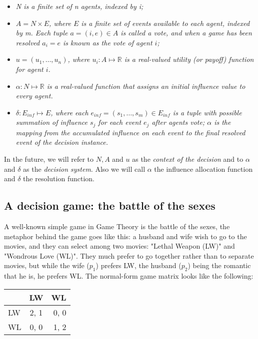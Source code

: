 \begin{itemize}
  \item \textit{N is a finite set of n agents, indexed by i;}
  \item \textit{$A = N \times E $, where $E$ is a finite set of events available to each agent, indexed by m. Each tuple $ a = (i, e) \in A $ is called a vote, and when a game has been resolved $a_{i} = e$ is known as the vote of agent $i$;}
  \item \textit{$u = (u_{1}, \dots , u_{n}) $, where $ u_{i} : A \mapsto \mathbb{R} $ is a real-valued utility (or payoff) function for agent $i$.}
  \item \textit{$ \alpha : N \mapsto \mathbb{R} $ is a real-valued function that assigns an initial influence value to every agent.}
  \item \textit{$ \delta : E_{inf} \mapsto E $, where each $e_{inf} = (s_1, \dots ,s_m) \in E_{inf}$ is a tuple with possible summation of influence $s_j$ for each event $e_j$ after agents vote; $\alpha$ is the mapping from the accumulated influence on each event to the final resolved event of the decision instance.}
\end{itemize}

In the future, we will refer to $N, A$ and $u$ as the \textit{context of the decision} and to $\alpha$ and $\delta$ as the \textit{decision system}. Also we will call $\alpha$ the influence allocation function and $\delta$ the resolution function.

\subsection{A decision game: the battle of the sexes}

A well-known simple game in Game Theory is the battle of the sexes, the metaphor behind the game goes like this: a husband and wife wish to go to the movies, and they can select among two movies: "Lethal Weapon (LW)" and "Wondrous Love (WL)". They much prefer to go together rather than to separate movies, but while the wife ($p_1$) prefers LW, the husband ($p_2$) being the romantic that he is, he prefers WL. The normal-form game matrix looks like the following:

\begin{center}
  \begin{tabular}{| l | c | r |}
    \hline
     & LW & WL \\ \hline
    LW & 2, 1 & 0, 0 \\ \hline
    WL & 0, 0 & 1, 2 \\ \hline
  \end{tabular}
\end{center}

